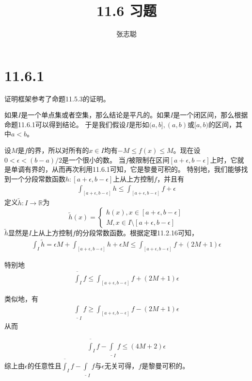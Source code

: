 \documentclass{article}
\begin{document}
\title{11.6 习题}
\author{张志聪}
\maketitle

\section*{11.6.1}

证明框架参考了命题11.5.3的证明。

如果$I$是一个单点集或者空集，那么结论是平凡的。如果$I$是一个闭区间，那么根据命题11.6.1可以得到结论。
于是我们假设$I$是形如$(a, b], (a, b)$或$[a, b)$的区间，其中$a < b$。

设$M$是$f$的界，所以对所有的$x \in I$均有$-M \leq f(x) \leq M$。现在设$0 < \epsilon < (b - a)/2$是一个很小的数。
当$f$被限制在区间$[a + \epsilon, b - \epsilon]$上时，它就是单调有界的，从而再次利用11.6.1可知，它是黎曼可积的。
特别地，我们能够找到一个分段常数函数$h: [a + \epsilon, b - \epsilon]$上从上方控制$f$，并且有
\begin{align*}
  \int_{[a + \epsilon, b - \epsilon]} h \leq \int_{[a + \epsilon, b - \epsilon]} f + \epsilon
\end{align*}
定义$\widetilde{h} : I \to \mathbb{R}$为
\begin{equation*}
  \widetilde{h}(x) =
  \begin{cases*}
    h(x), x \in [a + \epsilon, b - \epsilon] \\
    M, x \in I \setminus [a + \epsilon, b - \epsilon]
  \end{cases*}
\end{equation*}
$\widetilde{h}$显然是$I$上从上方控制$f$的分段常数函数。根据定理11.2.16可知，
\begin{align*}
  \int_{I}\widetilde{h}  = \epsilon M + \int_{[a + \epsilon, b - \epsilon]} h + \epsilon M
                         \leq \int_{[a + \epsilon, b - \epsilon]} f + (2M + 1)\epsilon
\end{align*}

特别地
\begin{align*}
  \overline{\int}_I f \leq \int_{[a + \epsilon, b - \epsilon]} f + (2M + 1)\epsilon
\end{align*}

类似地，有
\begin{align*}
  \underline{\int}_I f \geq \int_{[a + \epsilon, b - \epsilon]} f - (2M + 1)\epsilon
\end{align*}
从而

\begin{align*}
  \overline{\int}_I f - \underline{\int}_I f\leq (4M + 2)\epsilon
\end{align*}
综上由$\epsilon$的任意性且$\overline{\int}_I f - \underline{\int}_I f$与$\epsilon$无关可得，$f$是黎曼可积的。
\end{document}
